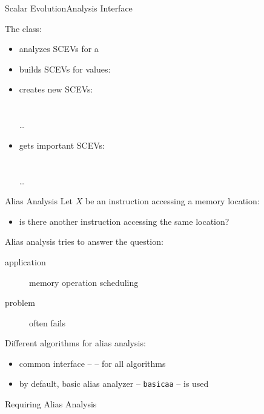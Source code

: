 \documentclass[10pt,mathserif]{beamer}
\begin{document}
\begin{frame}{Scalar Evolution}{Analysis Interface}

The  class:

\begin{itemize}
\item analyzes SCEVs for a 
\vfill
\item builds SCEVs for values: \\
\vfill
\item creates new SCEVs: \\
 \\
 \\
\ldots
\vfill
\item gets important SCEVs: \\
       \\
       \\
      \ldots
\end{itemize}
\end{frame}


\begin{frame}{Alias Analysis}
Let $X$ be an instruction accessing a memory location:

\begin{itemize}
\item is there another instruction accessing the same location?
\end{itemize}

\vfill
Alias analysis tries to answer the question:

\begin{description}
\item[application] memory operation scheduling
\item[problem] often fails
\end{description}

\vfill
Different algorithms for alias analysis:

\begin{itemize}
\item common interface --  -- for all algorithms
\item by default, basic alias analyzer -- \texttt{basicaa} -- is used
\end{itemize}

\begin{block}{Requiring Alias Analysis}
\centering
{}
\end{block}
\end{frame}
\end{document}

